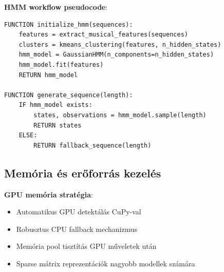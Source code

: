 \textbf{HMM workflow pseudocode}:
\begin{verbatim}
FUNCTION initialize_hmm(sequences):
    features = extract_musical_features(sequences)
    clusters = kmeans_clustering(features, n_hidden_states)
    hmm_model = GaussianHMM(n_components=n_hidden_states)
    hmm_model.fit(features)
    RETURN hmm_model

FUNCTION generate_sequence(length):
    IF hmm_model exists:
        states, observations = hmm_model.sample(length)
        RETURN states
    ELSE:
        RETURN fallback_sequence(length)
\end{verbatim}

\subsection{Memória és erőforrás kezelés}

\textbf{GPU memória stratégia}:
\begin{itemize}
    \item Automatikus GPU detektálás CuPy-val
    \item Robusztus CPU fallback mechanizmus
    \item Memória pool tisztítás GPU műveletek után
    \item Sparse mátrix reprezentációk nagyobb modellek számára
\end{itemize}